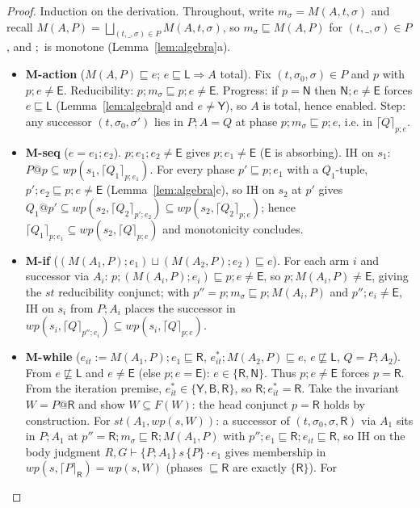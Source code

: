 \documentclass[11pt]{article}
\theoremstyle{plain}
\theoremstyle{plain}
\theoremstyle{definition}
\newcommand{\MY}{\mathsf{Y}}
\newcommand{\MB}{\mathsf{B}}
\newcommand{\MR}{\mathsf{R}}
\newcommand{\ML}{\mathsf{L}}
\newcommand{\MN}{\mathsf{N}}
\newcommand{\ME}{\mathsf{E}}
\newcommand{\sq}{\sqsubseteq}
\newcommand{\nsq}{\not\sqsubseteq}
\newcommand{\wpx}{\mathit{wp}}
\newcommand{\stp}{\mathit{st}}
\newcommand{\upemb}[2]{\lceil #1\rceil_{#2}}     %
\newcommand{\mljud}[6]{#1,#2\vdash\{#3\}\,#4\,\{#5\}\cdot #6}
\begin{document}
\begin{proof}
Induction on the derivation. Throughout, write $m_\sigma = M(A,t,\sigma)$ and
recall $M(A,P) = \bigsqcup_{(t,\_,\sigma)\in P} M(A,t,\sigma)$, so
$m_\sigma \sq M(A,P)$ for $(t,\_,\sigma)\in P$, and $;$ is monotone
(Lemma~\ref{lem:algebra}a).
\begin{itemize}[leftmargin=1.4em]
\item \textbf{M-action} ($M(A,P)\sq e$; $e\sq\ML\Rightarrow A$ total). Fix
  $(t,\sigma_0,\sigma)\in P$ and $p$ with $p;e\neq\ME$. Reducibility:
  $p;m_\sigma\sq p;e\neq\ME$. Progress: if $p=\MN$ then $\MN;e\neq\ME$ forces
  $e\sq\ML$ (Lemma~\ref{lem:algebra}d and $e \ne \MY$), so $A$ is total, hence
  enabled. Step: any successor $(t,\sigma_0,\sigma')$ lies in $P;A = Q$ at phase
  $p;m_\sigma\sq p;e$, i.e. in $\upemb{Q}{p;e}$.
\item \textbf{M-seq} ($e = e_1;e_2$). $p;e_1;e_2\neq\ME$ gives $p;e_1\neq\ME$
  ($\ME$ is absorbing). IH on $s_1$: $P@p\subseteq\wpx(s_1,\upemb{Q_1}{p;e_1})$.
  For every phase $p'\sq p;e_1$ with a $Q_1$-tuple, $p';e_2\sq p;e\neq\ME$
  (Lemma~\ref{lem:algebra}c), so IH on $s_2$ at $p'$ gives
  $Q_1@p'\subseteq\wpx(s_2,\upemb{Q_2}{p';e_2}) \subseteq\wpx(s_2,\upemb{Q_2}{p;e})$;
  hence $\upemb{Q_1}{p;e_1}\subseteq\wpx(s_2,\upemb{Q}{p;e})$ and monotonicity
  concludes.
\item \textbf{M-if} ($(M(A_1,P);e_1)\sqcup(M(A_2,P);e_2)\sq e$). For each arm $i$
  and successor via $A_i$: $p;(M(A_i,P);e_i)\sq p;e\neq\ME$, so
  $p;M(A_i,P)\neq\ME$, giving the $\stp$ reducibility conjunct; with
  $p''=p;m_\sigma\sq p;M(A_i,P)$ and $p'';e_i \neq \ME$, IH on $s_i$ from $P;A_i$
  places the successor in $\wpx(s_i,\upemb{Q}{p'';e_i})\subseteq\wpx(s_i,\upemb{Q}{p;e})$.
\item \textbf{M-while} ($e_{\mathit{it}} := M(A_1,P);e_1\sq\MR$,
  $e_{\mathit{it}}^*;M(A_2,P)\sq e$, $e\nsq\ML$, $Q = P;A_2$).
  From $e\nsq\ML$ and $e\neq\ME$ (else $p;e=\ME$): $e\in\{\MR,\MN\}$. Thus
  $p;e\neq\ME$ forces $p=\MR$. From the iteration premise,
  $e_{\mathit{it}}^*\in\{\MY,\MB,\MR\}$, so $\MR;e_{\mathit{it}}^*=\MR$.
  Take the invariant $W = P@\MR$ and show $W\subseteq F(W)$: the
  head conjunct $p=\MR$ holds by construction. For $\stp(A_1,\wpx(s,W))$: a
  successor of $(t,\sigma_0,\sigma,\MR)$ via $A_1$ sits in $P;A_1$ at
  $p''=\MR;m_\sigma \sq \MR;M(A_1,P)$ with
  $p'';e_1\sq\MR;e_{\mathit{it}}\sq\MR$, so IH on the body judgment
  $\mljud{R}{G}{P;A_1}{s}{P}{e_1}$ gives membership in
  $\wpx(s,\upemb{P}{\MR}) = \wpx(s,W)$ (phases $\sq\MR$ are exactly $\{\MR\}$). For

\end{itemize}
\end{proof}
\end{document}

